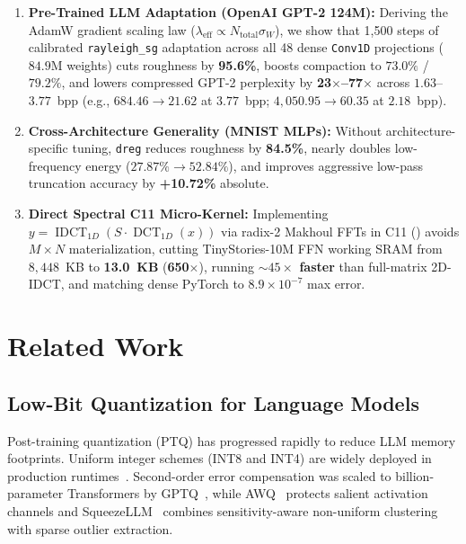 \documentclass[11pt,a4paper]{article}
\begin{document}
\begin{enumerate}
    \item \textbf{Pre-Trained LLM Adaptation (OpenAI GPT-2 124M):} Deriving the AdamW gradient scaling law ($\lambda_{\text{eff}} \propto N_{\text{total}} \sigma_W$), we show that 1,500 steps of calibrated \texttt{rayleigh\_sg} adaptation across all 48 dense \texttt{Conv1D} projections ($84.9$M weights) cuts roughness by \textbf{95.6\%}, boosts compaction to $73.0\%$ / $79.2\%$, and lowers compressed GPT-2 perplexity by \textbf{23$\times$--77$\times$} across $1.63$--$3.77$~bpp (e.g., $684.46 \to \mathbf{21.62}$ at $3.77$~bpp; $4{,}050.95 \to \mathbf{60.35}$ at $2.18$~bpp).
    \item \textbf{Cross-Architecture Generality (MNIST MLPs):} Without architecture-specific tuning, \texttt{dreg} reduces roughness by \textbf{84.5\%}, nearly doubles low-frequency energy ($27.87\% \to 52.84\%$), and improves aggressive low-pass truncation accuracy by \textbf{+10.72\%} absolute.
    \item \textbf{Direct Spectral C11 Micro-Kernel:} Implementing $y = \operatorname{IDCT}_{1D}(S \cdot \operatorname{DCT}_{1D}(x))$ via radix-2 Makhoul FFTs in C11 () avoids $M \times N$ materialization, cutting TinyStories-10M FFN working SRAM from $8{,}448$~KB to \textbf{13.0~KB} (\textbf{650$\times$}), running \textbf{$\sim 45\times$ faster} than full-matrix 2D-IDCT, and matching dense PyTorch to $8.9 \times 10^{-7}$ max error.
\end{enumerate}

\section{Related Work}
\label{sec:related}

\subsection{Low-Bit Quantization for Language Models}
Post-training quantization (PTQ) has progressed rapidly to reduce LLM memory footprints. Uniform integer schemes (INT8 and INT4) are widely deployed in production runtimes~\citep{dettmers2022llmint8,xiao2023smoothquant}. Second-order error compensation was scaled to billion-parameter Transformers by GPTQ~\citep{frantar2022gptq}, while AWQ~\citep{lin2023awq} protects salient activation channels and SqueezeLLM~\citep{kim2023squeezellm} combines sensitivity-aware non-uniform clustering with sparse outlier extraction.
\end{document}
